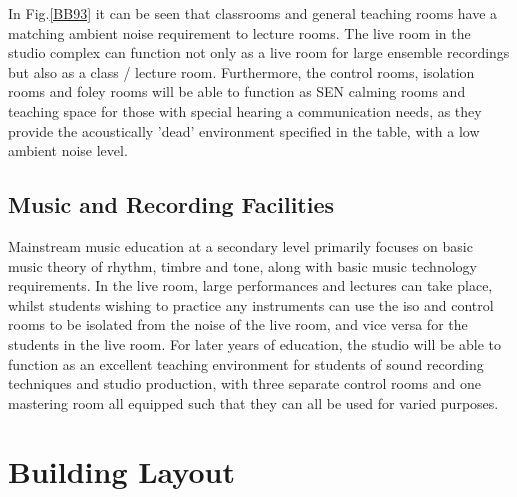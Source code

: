 \documentclass[10pt, twocolumn]{article}
\begin{document}
            In Fig.\ref{BB93} it can be seen that classrooms and general teaching rooms have a matching ambient noise requirement to lecture rooms.
            The live room in the studio complex can function not only as a live room for large ensemble recordings but also as a class / lecture room.
            Furthermore, the control rooms, isolation rooms and foley rooms will be able to function as SEN calming rooms and teaching space for those with special hearing a communication needs, as they provide the acoustically 'dead' environment specified in the table, with a low ambient noise level.

        \subsection{Music and Recording Facilities}
            Mainstream music education at a secondary level primarily focuses on basic music theory of rhythm, timbre and tone, along with basic music technology requirements.
            In the live room, large performances and lectures can take place, whilst students wishing to practice any instruments can use the iso and control rooms to be isolated from the noise of the live room, and vice versa for the students in the live room.
            For later years of education, the studio will be able to function as an excellent teaching environment for students of sound recording techniques and studio production, with three separate control rooms and one mastering room all equipped such that they can all be used for varied purposes.

    \section{Building Layout}
\end{document}
